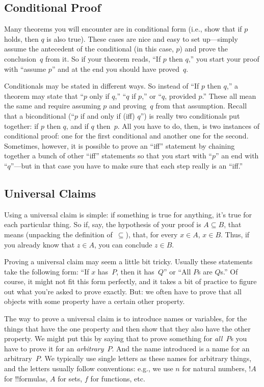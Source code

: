 \documentclass[../../../include/open-logic-section]{subfiles}
\begin{document}
\subsection{Conditional Proof}

Many theorems you will encounter are in conditional form (i.e., show
that if $p$ holds, then $q$ is also true). These cases are nice and
easy to set up---simply assume the antecedent of the conditional (in
this case, $p$) and prove the conclusion~$q$ from it.  So if your
theorem reads, ``If $p$ then $q$,'' you start your proof with ``assume
$p$'' and at the end you should have proved~$q$.

Conditionals may be stated in different ways. So instead of ``If $p$
then $q$,'' a theorem may state that ``$p$ only if $q$,'' ``$q$ if
$p$,'' or ``$q$, provided $p$.'' These all mean the same and require
assuming $p$ and proving~$q$ from that assumption.  Recall that a
biconditional (``$p$ if and only if (iff) $q$'') is really two
conditionals put together: if $p$ then $q$, and if $q$ then~$p$. All
you have to do, then, is two instances of conditional proof: one for
the first conditional and another one for the second. Sometimes,
however, it is possible to prove an ``iff'' statement by chaining
together a bunch of other ``iff'' statements so that you start with
``$p$'' an end with ``$q$''---but in that case you have to make sure
that each step really is an ``iff.''

\subsection{Universal Claims}

Using a universal claim is simple: if something is true for anything,
it's true for each particular thing.  So if, say, the hypothesis of
your proof is $A \subseteq B$, that means (unpacking the definition
of~$\subseteq$), that, for every $x \in A$, $x \in B$. Thus, if you
already know that $z \in A$, you can conclude $z \in B$.

Proving a universal claim may seem a little bit tricky. Usually these
statements take the following form: ``If $x$ has~$P$, then it
has~$Q$'' or ``All $P$s are $Q$s.'' Of course, it might not fit this
form perfectly, and it takes a bit of practice to figure out what
you're asked to prove exactly. But: we often have to prove that all objects
with some property have a certain other property.

The way to prove a universal claim is to introduce names or variables,
for the things that have the one property and then show that they also
have the other property.  We might put this by saying that to prove
something for \emph{all}~$P$s you have to prove it for an
\emph{arbitrary}~$P$. And the name introduced is a name for an
arbitrary~$P$.  We typically use single letters as these names for
arbitrary things, and the letters usually follow conventions: e.g., we
use $n$ for natural numbers, $!A$ for !!{formula}s, $A$ for sets, $f$
for functions, etc.
\end{document}
